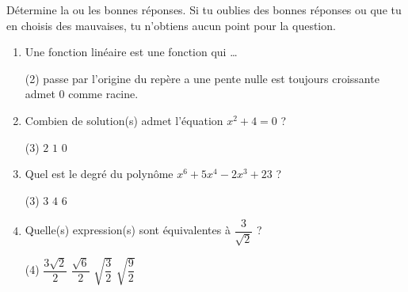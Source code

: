 %
%
    Détermine la ou les bonnes réponses. Si tu oublies des bonnes réponses ou que tu en choisis des mauvaises, tu n'obtiens aucun point pour la question.
    \begin{enumerate}
        \item Une fonction linéaire est une fonction qui \dots
              \begin{QCM}(2)
                  \choice passe par l'origine du repère
                  \choice a une pente nulle
                  \choice est toujours croissante
                  \choice admet $0$ comme racine.
              \end{QCM}
        \item Combien de solution(s) admet l'équation $x^2+4=0$ ?
              \begin{QCM}(3)
                  \choice $2$
                  \choice $1$
                  \choice $0$
              \end{QCM}
        \item Quel est le degré du polynôme $x^6 + 5x^4 -2x^3 +23$ ?
              \begin{QCM}(3)
                  \choice $3$
                  \choice $4$
                  \choice $6$
              \end{QCM}
        \item Quelle(s) expression(s) sont équivalentes à $\dfrac{3}{\sqrt{2}}$ ?
              \begin{QCM}(4)
                  \choice $\dfrac{3\sqrt{2}}{2}$
                  \choice $\dfrac{\sqrt{6}}{2}$
                  \choice $\sqrt{\dfrac{3}{2}}$
                  \choice $\sqrt{\dfrac{9}{2}}$
              \end{QCM}
    \end{enumerate}
